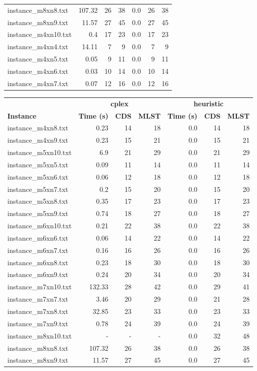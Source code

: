 \documentclass{article}
\begin{document}
\begin{center}
\begin{tabular}{lrrrrrr}
instance\_m8xn8.txt & 107.32 & 26 & 38
 & 0.0 & 26 & 38
\\
instance\_m8xn9.txt & 11.57 & 27 & 45
 & 0.0 & 27 & 45
\\
instance\_m4xn10.txt & 0.4 & 17 & 23
 & 0.0 & 17 & 23
\\
instance\_m4xn4.txt & 14.11 & 7 & 9
 & 0.0 & 7 & 9
\\
instance\_m4xn5.txt & 0.05 & 9 & 11
 & 0.0 & 9 & 11
\\
instance\_m4xn6.txt & 0.03 & 10 & 14
 & 0.0 & 10 & 14
\\
instance\_m4xn7.txt & 0.07 & 12 & 16
 & 0.0 & 12 & 16
\\
\hline\end{tabular}
\end{center}
\newpage
\begin{center}
\renewcommand{\arraystretch}{1.4}
 \begin{tabular}{lrrrrrr}
	\hline
 & \multicolumn{3}{c}{\textbf{cplex}} & \multicolumn{3}{c}{\textbf{heuristic}}\\
\textbf{Instance}  & \textbf{Time (s)} & \textbf{CDS} & \textbf{MLST}   & \textbf{Time (s)} & \textbf{CDS} & \textbf{MLST}  \\\hline

instance\_m4xn8.txt & 0.23 & 14 & 18
 & 0.0 & 14 & 18
\\
instance\_m4xn9.txt & 0.23 & 15 & 21
 & 0.0 & 15 & 21
\\
instance\_m5xn10.txt & 6.9 & 21 & 29
 & 0.0 & 21 & 29
\\
instance\_m5xn5.txt & 0.09 & 11 & 14
 & 0.0 & 11 & 14
\\
instance\_m5xn6.txt & 0.06 & 12 & 18
 & 0.0 & 12 & 18
\\
instance\_m5xn7.txt & 0.2 & 15 & 20
 & 0.0 & 15 & 20
\\
instance\_m5xn8.txt & 0.35 & 17 & 23
 & 0.0 & 17 & 23
\\
instance\_m5xn9.txt & 0.74 & 18 & 27
 & 0.0 & 18 & 27
\\
instance\_m6xn10.txt & 0.21 & 22 & 38
 & 0.0 & 22 & 38
\\
instance\_m6xn6.txt & 0.06 & 14 & 22
 & 0.0 & 14 & 22
\\
instance\_m6xn7.txt & 0.16 & 16 & 26
 & 0.0 & 16 & 26
\\
instance\_m6xn8.txt & 0.23 & 18 & 30
 & 0.0 & 18 & 30
\\
instance\_m6xn9.txt & 0.24 & 20 & 34
 & 0.0 & 20 & 34
\\
instance\_m7xn10.txt & 132.33 & 28 & 42
 & 0.0 & 29 & 41
\\
instance\_m7xn7.txt & 3.46 & 20 & 29
 & 0.0 & 21 & 28
\\
instance\_m7xn8.txt & 32.85 & 23 & 33
 & 0.0 & 23 & 33
\\
instance\_m7xn9.txt & 0.78 & 24 & 39
 & 0.0 & 24 & 39
\\
instance\_m8xn10.txt & - & - & - 
 & 0.0 & 32 & 48
\\
instance\_m8xn8.txt & 107.32 & 26 & 38
 & 0.0 & 26 & 38
\\
instance\_m8xn9.txt & 11.57 & 27 & 45
 & 0.0 & 27 & 45
\\
\hline\end{tabular}
\end{center}
\end{document}

